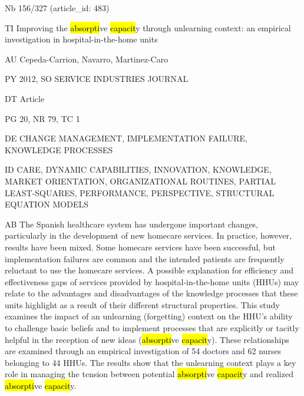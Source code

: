 \documentclass[a4paper]{article}
\begin{document}
\vspace*{-2cm}
Nb \tabto{0cm}156/327 (article\_id: 483)\par
TI \tabto{0cm}Improving the \hl{absorpti}ve \hl{capacit}y through unlearning context: an empirical investigation in hospital-in-the-home units\par
AU \tabto{0cm}Cepeda-Carrion, Navarro, Martinez-Caro\par
PY \tabto{0cm}2012, SO SERVICE INDUSTRIES JOURNAL\par
DT \tabto{0cm}Article\par
PG \tabto{0cm}20, NR 79, TC 1\par
DE \tabto{0cm}CHANGE MANAGEMENT, IMPLEMENTATION FAILURE, KNOWLEDGE PROCESSES\par
ID \tabto{0cm}CARE, DYNAMIC CAPABILITIES, INNOVATION, KNOWLEDGE, MARKET ORIENTATION, ORGANIZATIONAL ROUTINES, PARTIAL LEAST-SQUARES, PERFORMANCE, PERSPECTIVE, STRUCTURAL EQUATION MODELS\par
AB \tabto{0cm}The Spanish healthcare system has undergone important changes, particularly in the development of new homecare services. In practice, however, results have been mixed. Some homecare services have been successful, but implementation failures are common and the intended patients are frequently reluctant to use the homecare services. A possible explanation for efficiency and effectiveness gaps of services provided by hospital-in-the-home units (HHUs) may relate to the advantages and disadvantages of the knowledge processes that these units highlight as a result of their different structural properties. This study examines the impact of an unlearning (forgetting) context on the HHU's ability to challenge basic beliefs and to implement processes that are explicitly or tacitly helpful in the reception of new ideas (\hl{absorpti}ve \hl{capacit}y). These relationships are examined through an empirical investigation of 54 doctors and 62 nurses belonging to 44 HHUs. The results show that the unlearning context plays a key role in managing the tension between potential \hl{absorpti}ve \hl{capacit}y and realized \hl{absorpti}ve \hl{capacit}y.\par
\clearpage
\end{document}
